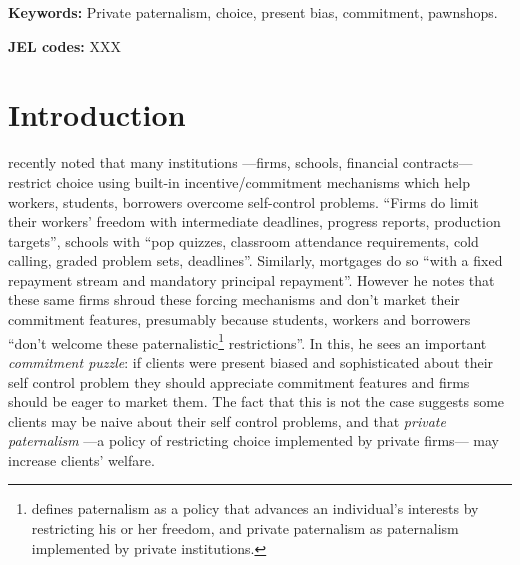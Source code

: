 \documentclass[11pt]{article}
\begin{document}
\textbf{Keywords: } Private paternalism, choice, present bias, commitment, pawnshops.

\textbf{JEL codes:} XXX

\newpage





\section{Introduction}

\cite{Laibson2018} recently noted that many institutions ---firms, schools, financial contracts--- restrict choice using built-in incentive/commitment mechanisms which help workers, students, borrowers overcome self-control problems. ``Firms do limit their workers' freedom with intermediate deadlines, progress reports, production targets'', schools with ``pop quizzes, classroom attendance requirements, cold calling, graded problem sets, deadlines''. Similarly, mortgages do so ``with a fixed repayment stream and mandatory principal repayment''. However he notes that these same firms shroud these forcing mechanisms and don't market their commitment features, presumably because students, workers and borrowers ``don't welcome these paternalistic\footnote{\cite{Laibson2018} defines paternalism as a policy that advances an individual's interests by restricting his or her freedom, and private paternalism as paternalism implemented by private institutions.} restrictions''. In this, he sees an important \textit{commitment puzzle}: if clients were present biased and  sophisticated about their self control problem they should appreciate commitment features and firms should be eager to market them. The fact that this is not the case suggests some clients may be naive about their self control problems, and that \textit{private paternalism}  ---a policy of restricting choice implemented by private firms--- may increase clients' welfare. 
\end{document}
